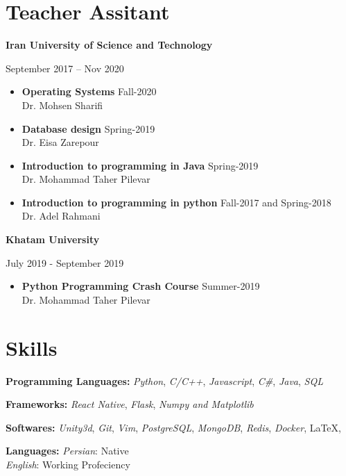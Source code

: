 \documentclass[11pt]{article}
\begin{document}
\section{Teacher Assitant}
\noindent \textbf{Iran University of Science and Technology} \par
September 2017 – Nov 2020
{
    \renewcommand\labelitemi{}
\begin{itemize}
    \item {\textbf{Operating Systems}  \null\hfill Fall-2020 \\ Dr. Mohsen Sharifi}
    \item {\textbf{Database design} \null\hfill Spring-2019 \\ Dr. Eisa Zarepour }
    \item {\textbf{Introduction to programming in Java} \null\hfill Spring-2019 \\
        Dr. Mohammad Taher Pilevar}
    \item {\textbf{Introduction to programming in python} \null\hfill Fall-2017 and Spring-2018 \\
 Dr. Adel Rahmani }
\end{itemize}
}

{
\renewcommand\labelitemi{}
\noindent \textbf{Khatam University} \par
July 2019 - September 2019
\begin{itemize}
    \item {\textbf{Python Programming Crash Course}  \null\hfill Summer-2019 \\
        Dr. Mohammad Taher Pilevar}
\end{itemize}
}


\section{Skills}
\textbf{Programming Languages:}
    \emph{Python},
    \emph{C/C++},
    \emph{Javascript},
    \emph{C\#},
    \emph{Java},
    \emph{SQL}

\textbf{Frameworks:}
    \emph{React Native},
    \emph{Flask},
    \emph{Numpy and Matplotlib}

\textbf{Softwares:}
    \emph{Unity3d},
    \emph{Git},
    \emph{Vim},
    \emph{PostgreSQL},
    \emph{MongoDB},
    \emph{Redis},
    \emph{Docker},
    \LaTeX,


\textbf{Languages:}
    \emph{Persian}: Native \\
    \emph{English}: Working Profeciency
\end{document}
